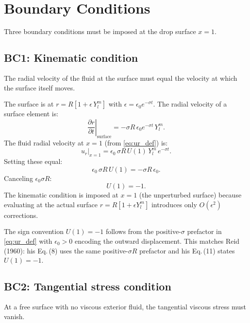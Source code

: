 \documentclass[12pt]{article}
\theoremstyle{definition}
\begin{document}
\section{Boundary Conditions}

Three boundary conditions must be imposed at the drop surface $x = 1$.

\subsection{BC1: Kinematic condition}
\label{sec:bc1}

The radial velocity of the fluid at the surface must equal the velocity at which
the surface itself moves.

\begin{derivbox}[Derivation of BC1]
The surface is at $r = R[1 + \epsilon\,Y_l^m]$ with $\epsilon = \epsilon_0 e^{-\sigma t}$.
The radial velocity of a surface element is:
\[
  \left.\frac{\partial r}{\partial t}\right|_{\text{surface}}
  = -\sigma R\,\epsilon_0 e^{-\sigma t}\,Y_l^m.
\]
The fluid radial velocity at $x = 1$ (from \eqref{eq:ur_def}) is:
\[
  u_r\big|_{x=1} = \epsilon_0\,\sigma R\,U(1)\,Y_l^m\,e^{-\sigma t}.
\]
Setting these equal:
\[
  \epsilon_0\,\sigma R\,U(1) = -\sigma R\,\epsilon_0.
\]
Canceling $\epsilon_0\sigma R$:
\begin{equation}
  U(1) = -1.
  \label{eq:BC1}
\end{equation}
The kinematic condition is imposed at $x=1$ (the unperturbed surface) because
evaluating at the actual surface $r=R[1+\epsilon Y_l^m]$ introduces only
$O(\epsilon^2)$ corrections.
\end{derivbox}

\begin{notebox}
The sign convention $U(1)=-1$ follows from the positive-$\sigma$ prefactor in
\eqref{eq:ur_def} with $\epsilon_0>0$ encoding the outward displacement.
This matches Reid (1960): his Eq.\,(8) uses the same positive-$\sigma R$ prefactor
and his Eq.\,(11) states $U(1)=-1$.
\end{notebox}

\subsection{BC2: Tangential stress condition}
\label{sec:bc2}

At a free surface with no viscous exterior fluid, the tangential viscous stress must
vanish.
\end{document}
